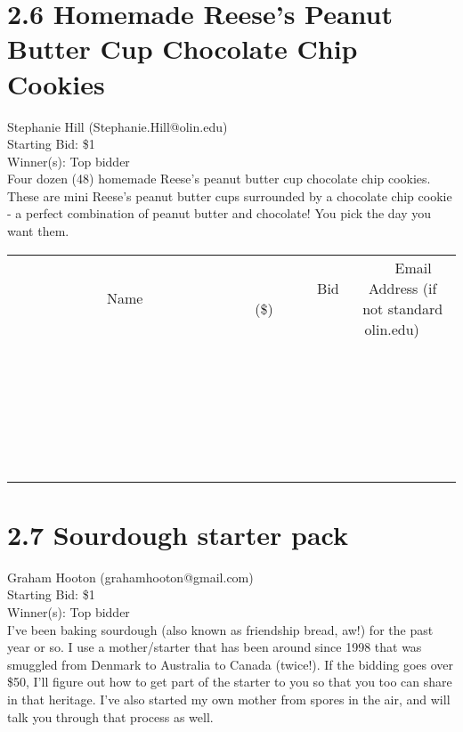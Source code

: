 \documentclass[11pt]{article}
\begin{document}
\section*{2.6 Homemade Reese's Peanut Butter Cup Chocolate Chip Cookies}
Stephanie Hill (Stephanie.Hill@olin.edu) \\
Starting Bid: \$1 \\
Winner(s): 
Top bidder \\
Four dozen (48) homemade Reese's peanut butter cup chocolate chip cookies.  These are mini Reese's peanut butter cups surrounded by a chocolate chip cookie - a perfect combination of peanut butter and chocolate! You pick the day you want them. \\[6ex]
\begin{tabular}{c c c}
~~~~~~~~~~~~~Name~~~~~~~~~~~~~ & ~~~~~~~~~Bid (\$)~~~~~~~~~ & ~~~Email Address (if not standard olin.edu)~~~ \\
 & & \\
\hline
 & & \\
\hline
 & & \\
\hline
 & & \\
\hline
 & & \\
\hline
 & & \\
\hline
 & & \\
\hline
 & & \\
\hline
 & & \\
\hline
 & & \\
\hline
 & & \\
\hline
 & & \\
\hline
 & & \\
\hline
 & & \\
\hline
 & & \\
\hline
 & & \\
\hline
 & & \\
\hline
 & & \\
\hline
 & & \\
\hline
 & & \\
\hline
 & & \\
\hline
 & & \\
\hline
 & & \\
\hline
 & & \\
\hline
 & & \\
\hline
 & & \\
\hline
\end{tabular}
\clearpage
\section*{2.7 Sourdough starter pack}
Graham Hooton (grahamhooton@gmail.com) \\
Starting Bid: \$1 \\
Winner(s): 
Top bidder \\
I've been baking sourdough (also known as friendship bread, aw!) for the past year or so. I use a mother/starter that has been around since 1998 that was smuggled from Denmark to Australia to Canada (twice!). If the bidding goes over \$50, I'll figure out how to get part of the starter to you so that you too can share in that heritage. I've also started my own mother from spores in the air, and will talk you through that process as well.
\end{document}
